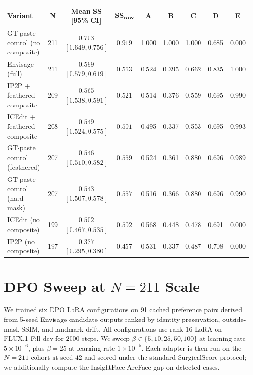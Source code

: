 \documentclass{article}
\newcommand{\method}{Envisage}
\newcommand{\best}[1]{\textbf{#1}}
\begin{document}
\begin{table}[h]
{\begin{tabular}{@{}lcccccccc@{}}
\toprule
\textbf{Variant} & \textbf{N} & \textbf{Mean SS [95\% CI]} & \textbf{SS\textsubscript{raw}} & \textbf{A} & \textbf{B} & \textbf{C} & \textbf{D} & \textbf{E} \\
\midrule
GT-paste control (no composite) & 211 & $0.703$ $[0.649, 0.756]$ & $0.919$ & 1.000 & 1.000 & 1.000 & 0.685 & 0.000 \\
\method{} (full)                & 211 & \best{$0.599$ $[0.579, 0.619]$} & $0.563$ & 0.524 & 0.395 & 0.662 & 0.835 & 1.000 \\
IP2P + feathered composite      & 209 & $0.565$ $[0.538, 0.591]$ & $0.521$ & 0.514 & 0.376 & 0.559 & 0.695 & 0.990 \\
ICEdit + feathered composite    & 208 & $0.549$ $[0.524, 0.575]$ & $0.501$ & 0.495 & 0.337 & 0.553 & 0.695 & 0.993 \\
GT-paste control (feathered)    & 207 & $0.546$ $[0.510, 0.582]$ & $0.569$ & 0.524 & 0.361 & 0.880 & 0.696 & 0.989 \\
GT-paste control (hard-mask)    & 207 & $0.543$ $[0.507, 0.578]$ & $0.567$ & 0.516 & 0.366 & 0.880 & 0.696 & 0.990 \\
ICEdit (no composite)           & 199 & $0.502$ $[0.467, 0.535]$ & $0.502$ & 0.568 & 0.448 & 0.478 & 0.691 & 0.000 \\
IP2P (no composite)             & 197 & $0.337$ $[0.295, 0.380]$ & $0.457$ & 0.531 & 0.337 & 0.487 & 0.708 & 0.000 \\
\bottomrule
\end{tabular}%
}
\end{table}

\section{DPO Sweep at $N{=}211$ Scale}
\label{app:dpo_sweep}

We trained six DPO LoRA configurations on 91 cached preference pairs derived
from 5-seed Envisage candidate outputs ranked by identity preservation,
outside-mask SSIM, and landmark drift. All configurations use rank-$16$ LoRA on
FLUX.1-Fill-dev for $2000$ steps. We sweep $\beta\!\in\!\{5,10,25,50,100\}$ at
learning rate $5{\times}10^{-6}$, plus $\beta{=}25$ at learning rate
$1{\times}10^{-5}$. Each adapter is then run on the $N{=}211$ cohort
at seed $42$ and scored under the standard SurgicalScore protocol; we
additionally compute the InsightFace ArcFace gap on detected cases.
\end{document}
